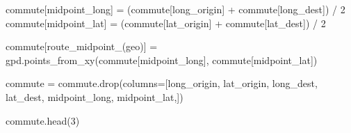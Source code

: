 \documentclass[
  number]{elsarticle}
\newenvironment{Shaded}{\begin{snugshade}}{\end{snugshade}}
\newcommand{\DecValTok}[1]{\textcolor[rgb]{0.68,0.00,0.00}{#1}}
\newcommand{\NormalTok}[1]{\textcolor[rgb]{0.00,0.23,0.31}{#1}}
\newcommand{\OperatorTok}[1]{\textcolor[rgb]{0.37,0.37,0.37}{#1}}
\newcommand{\StringTok}[1]{\textcolor[rgb]{0.13,0.47,0.30}{#1}}
\begin{document}
\begin{Shaded}
\begin{Highlighting}[]
\NormalTok{commute[}\StringTok{\textquotesingle{}midpoint\_long\textquotesingle{}}\NormalTok{] }\OperatorTok{=}\NormalTok{ (commute[}\StringTok{\textquotesingle{}long\_origin\textquotesingle{}}\NormalTok{] }\OperatorTok{+}\NormalTok{ commute[}\StringTok{\textquotesingle{}long\_dest\textquotesingle{}}\NormalTok{]) }\OperatorTok{/} \DecValTok{2}
\NormalTok{commute[}\StringTok{\textquotesingle{}midpoint\_lat\textquotesingle{}}\NormalTok{] }\OperatorTok{=}\NormalTok{ (commute[}\StringTok{\textquotesingle{}lat\_origin\textquotesingle{}}\NormalTok{] }\OperatorTok{+}\NormalTok{ commute[}\StringTok{\textquotesingle{}lat\_dest\textquotesingle{}}\NormalTok{]) }\OperatorTok{/} \DecValTok{2}

\NormalTok{commute[}\StringTok{\textquotesingle{}route\_midpoint\_(geo)\textquotesingle{}}\NormalTok{] }\OperatorTok{=}\NormalTok{ gpd.points\_from\_xy(commute[}\StringTok{\textquotesingle{}midpoint\_long\textquotesingle{}}\NormalTok{], commute[}\StringTok{\textquotesingle{}midpoint\_lat\textquotesingle{}}\NormalTok{])}

\NormalTok{commute }\OperatorTok{=}\NormalTok{ commute.drop(columns}\OperatorTok{=}\NormalTok{[}\StringTok{\textquotesingle{}long\_origin\textquotesingle{}}\NormalTok{, }\StringTok{\textquotesingle{}lat\_origin\textquotesingle{}}\NormalTok{, }\StringTok{\textquotesingle{}long\_dest\textquotesingle{}}\NormalTok{, }\StringTok{\textquotesingle{}lat\_dest\textquotesingle{}}\NormalTok{, }\StringTok{\textquotesingle{}midpoint\_long\textquotesingle{}}\NormalTok{, }\StringTok{\textquotesingle{}midpoint\_lat\textquotesingle{}}\NormalTok{,])}

\NormalTok{commute.head(}\DecValTok{3}\NormalTok{)}
\end{Highlighting}
\end{Shaded}
\end{document}
